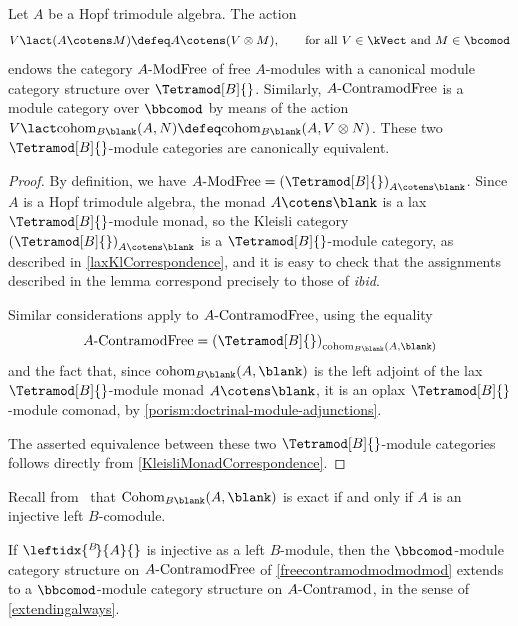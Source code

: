 \begin{lemma}\label{freecontramodmodmodmod}
  Let \(A\) be a Hopf trimodule algebra.
  The action
  \[
    V \lact (A \cotens M) \defeq A \cotens (V \otimes M),
    \qquad
    \text{for all \(V \in \kVect\) and \(M \in \bcomod\)}
  \]
  endows the category \(A\textnormal{-ModFree}\) of free \(A\)\hyp{}modules
  with a canonical module category structure over \(\Tetramod[B]{}\).
  Similarly, \(A\textnormal{-ContramodFree}\) is a module category over \(\bbcomod\) by means of the action
  \(V \lact \mathrm{cohom}_{B\blank}(A,N) \defeq \mathrm{cohom}_{B\blank}(A,V \otimes N)\).
  These two \(\Tetramod[B]{}\)\hyp{}module categories are canonically equivalent.
\end{lemma}
\begin{proof}
  By definition, we have \(A\textnormal{-ModFree} = {(\Tetramod[B]{})}_{A \cotens \blank}\).
  Since \(A\) is a Hopf trimodule algebra,
  the monad \(A \cotens \blank\) is a lax \(\Tetramod[B]{}\)\hyp{}module monad,
  so the Kleisli category \({(\Tetramod[B]{})}_{A \cotens \blank}\) is a \(\Tetramod[B]{}\)\hyp{}module category,
  as described in \cref{laxKlCorrespondence},
  and it is easy to check that the assignments described in the lemma correspond precisely to those of \emph{ibid}.

  Similar considerations apply to \(A\textnormal{-ContramodFree}\),
  using the equality
  \[
    A\textnormal{-ContramodFree} = {(\Tetramod[B]{})}_{\mathrm{cohom}_{B\blank}(A,\blank)}
  \]
  and the fact that,
  since \(\mathrm{cohom}_{B\blank}(A,\blank)\) is the left adjoint of the lax \(\Tetramod[B]{}\)\hyp{}module monad \(A \cotens \blank\),
  it is an oplax \(\Tetramod[B]{}\)\hyp{}module comonad, by \cref{porism:doctrinal-module-adjunctions}.

  The asserted equivalence between these two \(\Tetramod[B]{}\)\hyp{}module categories
  follows directly from \cref{KleisliMonadCorrespondence}.
\end{proof}

Recall from~\cite[1.12]{takeuchi77:morit} that \(\mathrm{Cohom}_{B\blank}(A,\blank)\) is exact if and only if \(A\) is an injective left \(B\)\hyp{}comodule.

\begin{proposition}
  If \(\leftidx{^B\!}{A}{}\) is injective as a left \(B\)\hyp{}module,
  then the \(\bbcomod\)\hyp{}module category structure on \(A\textnormal{-ContramodFree}\) of \cref{freecontramodmodmodmod}
  extends to a \(\bbcomod\)\hyp{}module category structure on \(A\textnormal{-Contramod}\),
  in the sense of \cref{extendingalways}.
\end{proposition}

